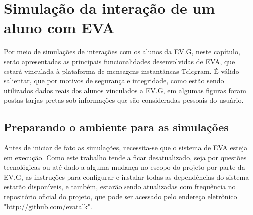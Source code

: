 %
%
%
%

\chapter{Simulação da interação de um aluno com EVA}

Por meio de simulações de interações com os alunos da EV.G, neste capítulo, serão apresentadas as principais funcionalidades desenvolvidas de EVA, que estará vinculada à plataforma de mensagens instantâneas Telegram. É válido salientar, que por motivos de segurança e integridade, como estão sendo utilizados dados reais dos alunos vinculados a EV.G, em algumas figuras foram postas tarjas pretas sob informações que são consideradas pessoais do usuário.

\section{Preparando o ambiente para as simulações}

Antes de iniciar de fato as simulações, necessita-se que o sistema de EVA esteja em execução.
Como este trabalho tende a ficar desatualizado, seja por questões tecnológicas ou até dado a alguma mudança no escopo do projeto por parte da EV.G, as instruções para configurar e instalar todas as dependências do sistema estarão disponíveis, e também, estarão sendo atualizadas com frequência no repositório oficial do projeto, que pode ser acessado pelo endereço eletrônico "http://github.com/evatalk".

